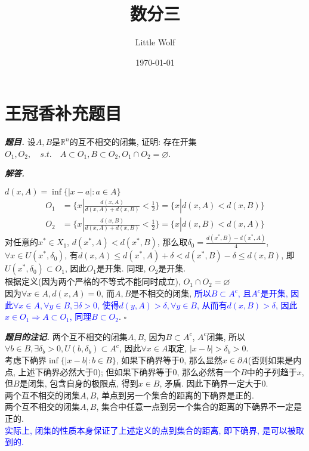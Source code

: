 \documentclass[10pt, a4paper, oneside]{ctexart}
\title{\textbf{数分三}}
\author{Little Wolf}
\date{\today}
\newenvironment{problem}{\begin{framed}\par\noindent\textbf{\textit{题目. }}}{\end{framed}\par}
\newenvironment{solution}{%
  \par\noindent\textbf{\textit{解答. }}\ignorespaces
}{%
  \hfill\ensuremath{\square}\par %
}
\newenvironment{note}{\par\noindent\textbf{\textit{题目的注记. }}\ignorespaces}{\par}
\begin{document}
\maketitle

\tableofcontents
\newpage

\section{王冠香补充题目}
\begin{problem}
    设$A,B$是$\mathbb{R}^n$的互不相交的闭集, 证明: 存在开集$O_1,O_2, \quad s.t.\quad A\subset O_1, B\subset O_2, O_1\cap O_2 = \varnothing$.
\end{problem}

\begin{solution}
    $d(x,A)=\inf\{|x-a|:a\in A\}$
\begin{align*}
    O_1&=\{x|\frac{d(x,A)}{d(x,A)+d(x,B)}<\frac{1}{2}\}=\{x|d(x,A)<d(x,B)\}\\
    O_2&=\{x|\frac{d(x,B)}{d(x,A)+d(x,B)}<\frac{1}{2}\}=\{x|d(x,B)<d(x,A)\}
\end{align*}
对任意的$x^*\in X_1$, $d(x^*,A)<d(x^*,B)$, 那么取$\delta_0=\frac{d(x^*,B)-d(x^*,A)}{4}$, $\forall x\in U(x^*,\delta_0)$, 有$d(x,A)\leq d(x^*,A)+\delta < d(x^*,B)-\delta\leq d(x,B)$, 即$U(x^*,\delta_0)\subset O_1$, 因此$O_1$是开集. 同理, $O_2$是开集.\\
根据定义(因为两个严格的不等式不能同时成立), $O_1\cap O_2=\varnothing$\\
因为$\forall x\in A, d(x,A)=0$, 而$A,B$是不相交的闭集, \textcolor{blue}{所以$B\subset A^c$, 且$A^c$是开集, 因此$\forall x\in A, \forall y\in B, \exists  \delta>0$, 使得$d(y,A)>\delta, \forall y\in B$, 从而有$d(x,B)>\delta$, 因此$x\in O_1\Rightarrow A\subset O_1$, 同理$B\subset O_2$}.
\end{solution}
\begin{note}
两个互不相交的闭集$A,B$, 因为$B\subset A^c$, $A^c$闭集, 所以$\forall b\in B, \exists \delta_b>0, U(b,\delta_b)\subset A^c$, 因此$\forall x\in A$取定, $|x-b|>\delta_b>0$.\\
考虑下确界$\inf\{|x-b|:b\in B\}$, 如果下确界等于$0$, 那么显然$x\in \partial A$(否则如果是内点, 上述下确界必然大于$0$); 但如果下确界等于$0$, 那么必然有一个$B$中的子列趋于$x$, 但$B$是闭集, 包含自身的极限点, 得到$x\in B$, 矛盾. 因此下确界一定大于$0$.\\ 
两个互不相交的闭集$A,B$, 单点到另一个集合的距离的下确界是正的.\\
两个互不相交的闭集$A,B$, 集合中任意一点到另一个集合的距离的下确界不一定是正的.\\
\textcolor{blue}{实际上, 闭集的性质本身保证了上述定义的点到集合的距离, 即下确界, 是可以被取到的.}
\end{note}
\end{document}
